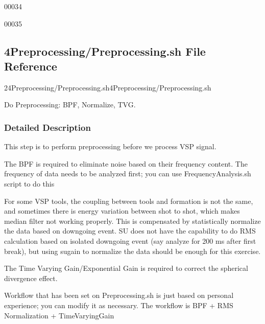 \documentclass{article}
\begin{document}
\vspace{4pt}
\parindent=0pt
00034 

\vspace{4pt}
00035 \newpage

\newpage
\vspace{12pt}
\subsection*{{\large{}\textbf{4Preprocessing/Preprocessing.sh File Reference}}}

\vspace{12pt}
24Preprocessing/Preprocessing.sh4Preprocessing/Preprocessing.sh\label{AAAAAAAAAK}

\vspace{12pt}
Do Preprocessing: BPF, Normalize, TVG. 

\vspace{24pt}
\subsubsection*{\textbf{Detailed Description}}

\vspace{1pt}
This step is to perform preprocessing before we process VSP signal.

\vspace{1pt}
The BPF is required to eliminate noise based on their frequency content. The frequency 
of data needs to be analyzed first; you can use FrequencyAnalysis.sh script to 
do this

\vspace{1pt}
For some VSP tools, the coupling between tools and formation is not the same, and 
sometimes there is energy variation between shot to shot, which makes median filter 
not working properly. This is compensated by statistically normalize the data based 
on downgoing event. SU does not have the capability to do RMS calculation based 
on isolated downgoing event (say analyze for 200 ms after first break), but using 
sugain to normalize the data should be enough for this exercise. 

\vspace{1pt}
The Time Varying Gain/Exponential Gain is required to correct the spherical divergence 
effect.

\vspace{1pt}
Workflow that has been set on Preprocessing.sh is just based on personal experience; 
you can modify it as necessary. The workflow is BPF + RMS Normalization + TimeVaryingGain
\end{document}

